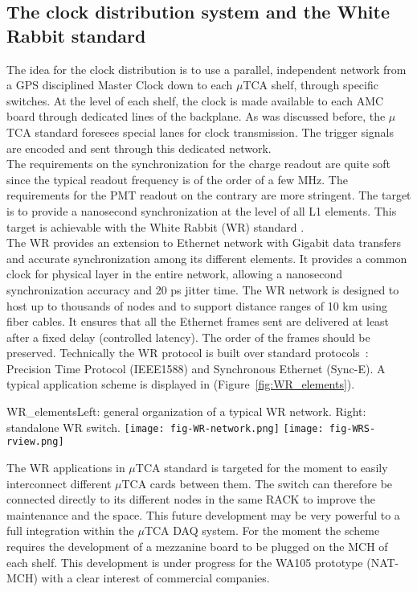 \subsection{The clock distribution system and the White Rabbit standard}

The idea for the clock distribution is to use a parallel, independent network from a GPS disciplined Master Clock down to each $\mu$TCA shelf, through specific switches. At the level of each shelf, the clock is made available to each AMC board through dedicated lines of the backplane. As was discussed before, the $\mu$TCA standard foresees special lanes for clock transmission. The trigger signals are encoded and sent through this dedicated network.\\
The requirements on the synchronization for the charge readout are quite soft since the typical readout frequency is of the order of a few MHz. The requirements for the PMT readout on the contrary are more stringent. The target is to provide a nanosecond synchronization at the level of all L1 elements. This target is achievable with the White Rabbit (WR) standard \cite{WR-standard}.\\

The WR provides an extension to Ethernet network with Gigabit data transfers and accurate synchronization among its different elements. It provides a common clock for physical layer in the entire network, allowing a nanosecond synchronization accuracy and 20 ps jitter time. The WR network is designed to host up to thousands of nodes and to support distance ranges of 10 km using fiber cables. It ensures that all the Ethernet frames sent are delivered at least after a fixed delay (controlled latency). The order of the frames should be preserved. Technically the WR protocol is built over standard protocols~: Precision Time Protocol (IEEE1588) and Synchronous Ethernet (Sync-E). A typical application scheme is displayed in  (Figure~\ref{fig:WR_elements}).\\

\begin{cdrfigure}{WR_elements}{\small Left: general organization of a typical WR network. Right: standalone WR switch.}
\texttt{[image: fig-WR-network.png]}
\texttt{[image: fig-WRS-rview.png]}
\end{cdrfigure}

The WR applications in $\mu$TCA standard is targeted for the moment to easily interconnect different $\mu$TCA cards between them. The switch can therefore be connected directly to its different nodes in the same RACK to improve the maintenance and the space. This future development may be very powerful to a full integration within the $\mu$TCA DAQ system. For the moment the scheme requires the development of a mezzanine board to be plugged on the MCH of each shelf. This development is under progress for the WA105 prototype (NAT-MCH) with a clear interest of commercial companies.   
 
